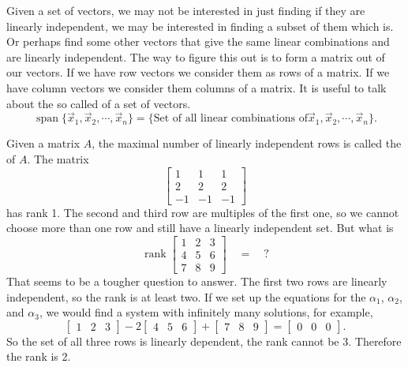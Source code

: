 Given a set of vectors, we may not be interested in just finding if they
are linearly independent, we may be interested in finding a subset of
them which is.  Or perhaps find some other vectors that give the same linear
combinations and are linearly independent.
The way to figure this out is to form a matrix out of our vectors.  If we
have row vectors we consider them as rows of a matrix.  If we have
column vectors we consider them columns of a matrix.
It is useful to talk about the so called \emph{} of a
set of vectors.
\begin{equation*}
\operatorname{span} \bigl\{ \vec{x}_1, \vec{x}_2 , \cdots , \vec{x}_n \bigr\}
=
\bigl\{
\text{Set of all linear combinations of
$\vec{x}_1, \vec{x}_2 , \cdots , \vec{x}_n$}
\bigr\} .
\end{equation*}


Given a matrix $A$, the maximal number of linearly independent rows is called
the \emph{} of $A$.  The matrix
\begin{equation*}
\begin{bmatrix}
1 & 1 & 1 \\
2 & 2 & 2 \\
-1 & -1 & -1
\end{bmatrix}
\end{equation*}
has rank 1.  
The second and third
row are multiples of the first one, so we cannot choose more than one row and
still have a linearly independent set.   But what is
\begin{equation*}
\operatorname{rank}
\begin{bmatrix}
1 & 2 & 3 \\
4 & 5 & 6 \\
7 & 8 & 9
\end{bmatrix} \quad = \quad ?
\end{equation*}
That seems to be a tougher question to answer.  The
first two rows are linearly independent, so the rank is at least
two.  If we set up the equations for the $\alpha_1$, $\alpha_2$, and
$\alpha_3$, we would find a system with infinitely many solutions, for example,
\begin{equation*}
\begin{bmatrix}
1 & 2 & 3
\end{bmatrix} -2
\begin{bmatrix}
4 & 5 & 6 
\end{bmatrix} +
\begin{bmatrix}
7 & 8 & 9
\end{bmatrix} =
\begin{bmatrix}
0 & 0 & 0
\end{bmatrix} .
\end{equation*}
So the set of all three rows is linearly dependent, the rank cannot be
3.  Therefore the rank is 2.

